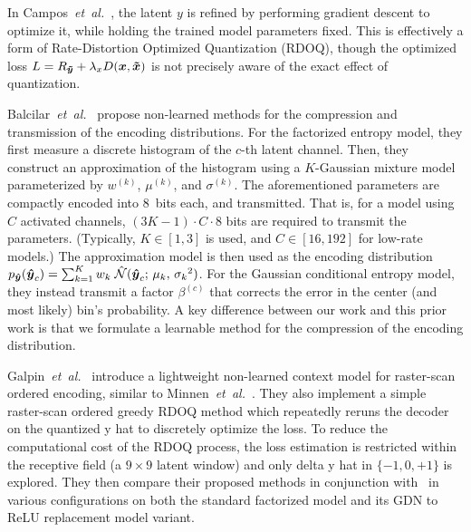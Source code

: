 In Campos~\emph{et~al.}~\cite{campos2019content}, the latent $y$ is refined by performing gradient descent to optimize it, while holding the trained model parameters fixed.
This is effectively a form of Rate-Distortion Optimized Quantization (RDOQ), though the optimized loss
$L = R_{{\boldsymbol{\tilde{y}}}} + \lambda_x D({\boldsymbol{x}}, {\boldsymbol{\tilde{x}}})$
is not precisely aware of the exact effect of quantization.  %

Balcilar~\emph{et~al.}~\cite{balcilar2022amortizationgap} propose non-learned methods for the compression and transmission of the encoding distributions.
For the factorized entropy model, they first measure a discrete histogram of the $c$-th latent channel.
Then, they construct an approximation of the histogram using a $K$-Gaussian mixture model parameterized by $w^{(k)}$, $\mu^{(k)}$, and $\sigma^{(k)}$.
The aforementioned parameters are compactly encoded into 8~bits each, and transmitted.
That is, for a model using $C$ activated channels, $(3K - 1) \cdot C \cdot 8$ bits are required to transmit the parameters.
(Typically, $K \in [1, 3]$ is used, and $C \in [16, 192]$ for low-rate models.)
The approximation model is then used as the encoding distribution
$p_{{\boldsymbol{\hat{y}}}}({\boldsymbol{\hat{y}}}_c) = \sum_{k=1}^K w_k \; \mathcal{\hat{N}}({\boldsymbol{\hat{y}}}_c ; \, \mu_k, \, {\sigma_k}^2)$.
For the Gaussian conditional entropy model, they instead transmit a factor $\beta^{(c)}$ that corrects the error in the center (and most likely) bin's probability.
A key difference between our work and this prior work is that we formulate a learnable method for the compression of the encoding distribution.

Galpin~\emph{et~al.}~\cite{galpin2023entropy} introduce a lightweight non-learned context model for raster-scan ordered encoding, similar to Minnen~\emph{et~al.}~\cite{minnen2018joint}.
They also implement a simple raster-scan ordered greedy RDOQ method which repeatedly reruns the decoder on the quantized y hat to discretely optimize the loss.
To reduce the computational cost of the RDOQ process, the loss estimation is restricted within the receptive field (a $9 \times 9$ latent window) and only delta y hat in $\{-1, 0, +1\}$ is explored.
They then compare their proposed methods in conjunction with~\cite{campos2019content,balcilar2022amortizationgap} in various configurations on both the standard factorized model and its GDN to ReLU replacement model variant.

%




